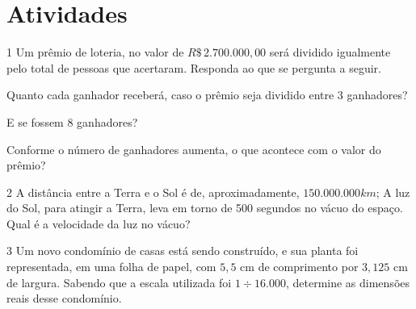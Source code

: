 \section*{Atividades}




\num{1} Um prêmio de loteria, no valor de $R\$\,2.700.000,00$ será dividido
igualmente pelo total de pessoas que acertaram. Responda ao que se pergunta a seguir.

\begin{escolha}[itemsep=0pt]
\item Quanto cada ganhador receberá, caso o prêmio seja dividido entre 3 ganhadores?


\item E se fossem 8 ganhadores?



\item Conforme o número de ganhadores aumenta, o que acontece com o valor do prêmio?


\end{escolha}


\num{2} A distância entre a Terra e o Sol é de, aproximadamente, $150.000.000 km$; 
A luz do Sol, para atingir a Terra, leva em torno de 500 segundos no vácuo do espaço.
Qual é a velocidade da luz no vácuo?

\bigskip




\bigskip

\num{3} Um novo condomínio de casas está sendo construído, e sua planta foi
representada, em uma folha de papel, com $5,5$ cm de comprimento por $3,125$
cm de largura. Sabendo que a escala utilizada foi $1 \div 16.000$, determine
as dimensões reais desse condomínio.

\bigskip



